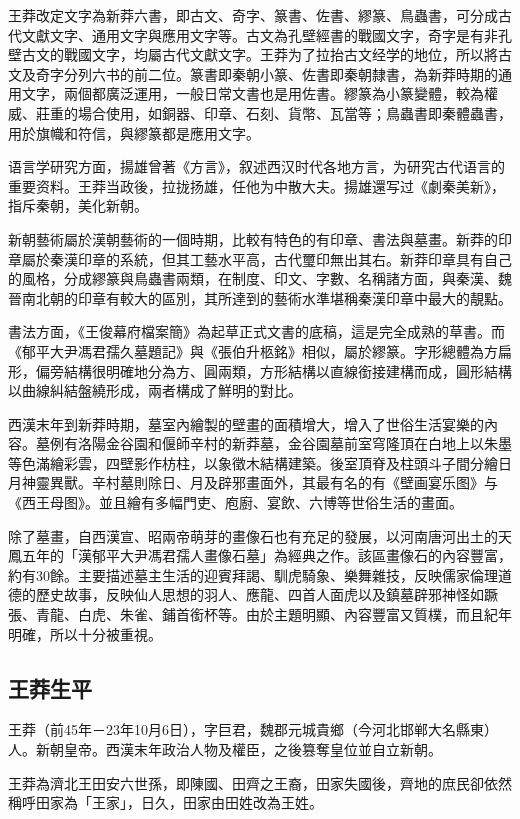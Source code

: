 王莽改定文字為新莽六書，即古文、奇字、篆書、佐書、繆篆、鳥蟲書，可分成古代文獻文字、通用文字與應用文字等。古文為孔壁經書的戰國文字，奇字是有非孔壁古文的戰國文字，均屬古代文獻文字。王莽为了拉抬古文经学的地位，所以將古文及奇字分列六书的前二位。篆書即秦朝小篆、佐書即秦朝隸書，為新莽時期的通用文字，兩個都廣泛運用，一般日常文書也是用佐書。繆篆為小篆變體，較為權威、莊重的場合使用，如銅器、印章、石刻、貨幣、瓦當等；鳥蟲書即秦體蟲書，用於旗幟和符信，與繆篆都是應用文字。

语言学研究方面，揚雄曾著《方言》，叙述西汉时代各地方言，为研究古代语言的重要资料。王莽当政後，拉拢扬雄，任他为中散大夫。揚雄還写过《劇秦美新》，指斥秦朝，美化新朝。

新朝藝術屬於漢朝藝術的一個時期，比較有特色的有印章、書法與墓畫。新莽的印章屬於秦漢印章的系統，但其工藝水平高，古代璽印無出其右。新莽印章具有自己的風格，分成繆篆與鳥蟲書兩類，在制度、印文、字數、名稱諸方面，與秦漢、魏晉南北朝的印章有較大的區別，其所達到的藝術水準堪稱秦漢印章中最大的靚點。

書法方面，《王俊幕府檔案簡》為起草正式文書的底稿，這是完全成熟的草書。而《郁平大尹馮君孺久墓題記》與《張伯升柩銘》相似，屬於繆篆。字形總體為方扁形，偏旁結構很明確地分為方、圓兩類，方形結構以直線銜接建構而成，圓形結構以曲線糾結盤繞形成，兩者構成了鮮明的對比。

西漢末年到新莽時期，墓室內繪製的壁畫的面積增大，增入了世俗生活宴樂的內容。墓例有洛陽金谷園和偃師辛村的新莽墓，金谷園墓前室穹隆頂在白地上以朱墨等色滿繪彩雲，四壁影作枋柱，以象徵木結構建築。後室頂脊及柱頭斗子間分繪日月神靈異獸。辛村墓則除日、月及辟邪畫面外，其最有名的有《壁画宴乐图》与《西王母图》。並且繪有多幅門吏、庖廚、宴飲、六博等世俗生活的畫面。

除了墓畫，自西漢宣、昭兩帝萌芽的畫像石也有充足的發展，以河南唐河出土的天鳳五年的「漢郁平大尹馮君孺人畫像石墓」為經典之作。該區畫像石的內容豐富，約有30餘。主要描述墓主生活的迎賓拜謁、馴虎騎象、樂舞雜技，反映儒家倫理道德的歷史故事，反映仙人思想的羽人、應龍、四首人面虎以及鎮墓辟邪神怪如蹶張、青龍、白虎、朱雀、鋪首銜杯等。由於主題明顯、內容豐富又質樸，而且紀年明確，所以十分被重視。

\subsection{王莽生平}

王莽（前45年－23年10月6日），字巨君，魏郡元城貴鄉（今河北邯郸大名縣東）人。新朝皇帝。西漢末年政治人物及權臣，之後篡奪皇位並自立新朝。

王莽為濟北王田安六世孫，即陳國、田齊之王裔，田家失國後，齊地的庶民卻依然稱呼田家為「王家」，日久，田家由田姓改為王姓。

